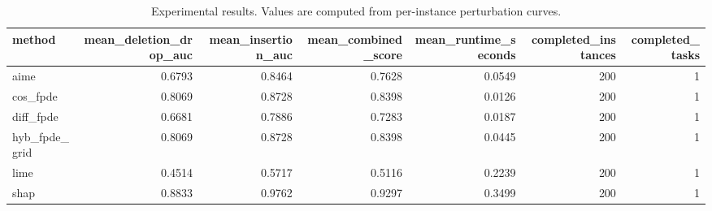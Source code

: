 \begin{table}[t]
\caption{Experimental results. Values are computed from per-instance perturbation curves.}
\label{tab:main_results_computed}
\centering
\begin{tabular}{lrrrrrr}
\toprule
method & mean\_deletion\_drop\_auc & mean\_insertion\_auc & mean\_combined\_score & mean\_runtime\_seconds & completed\_instances & completed\_tasks \\
\midrule
aime & 0.6793 & 0.8464 & 0.7628 & 0.0549 & 200 & 1 \\
cos\_fpde & 0.8069 & 0.8728 & 0.8398 & 0.0126 & 200 & 1 \\
diff\_fpde & 0.6681 & 0.7886 & 0.7283 & 0.0187 & 200 & 1 \\
hyb\_fpde\_grid & 0.8069 & 0.8728 & 0.8398 & 0.0445 & 200 & 1 \\
lime & 0.4514 & 0.5717 & 0.5116 & 0.2239 & 200 & 1 \\
shap & 0.8833 & 0.9762 & 0.9297 & 0.3499 & 200 & 1 \\
\bottomrule
\end{tabular}

\end{table}
